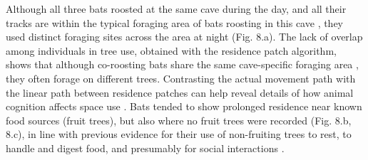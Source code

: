 \begin{refsection}
    Although all three bats roosted at the same cave during the day, and all their tracks are within the typical foraging area of bats roosting in this cave \citep{lourie2021}, they used distinct foraging sites across the area at night (Fig. 8.a). The lack of overlap among individuals in tree use, obtained with the residence patch algorithm, shows that although co-roosting bats share the same cave-specific foraging area \citep{lourie2021}, they often forage on different trees.
    Contrasting the actual movement path with the linear path between residence patches can help reveal details of how animal cognition affects space use \citep{toledo2020}.
    Bats tended to show prolonged residence near known food sources (fruit trees), but also where no fruit trees were recorded (Fig. 8.b, 8.c), in line with previous evidence for their use of non-fruiting trees to rest, to handle and digest food, and presumably for social interactions \citep{tsoar2011}.



\end{refsection}
